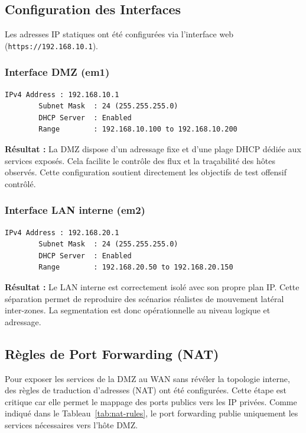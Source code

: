 \documentclass[12pt,a4paper,openany]{report}
\begin{document}
	\subsection{Configuration des Interfaces}
	Les adresses IP statiques ont été configurées via l'interface web (\texttt{https://192.168.10.1}).
	
	\subsubsection{Interface DMZ (em1)}
	\begin{lstlisting}[caption=Configuration IP DMZ]
		IPv4 Address : 192.168.10.1
		Subnet Mask  : 24 (255.255.255.0)
		DHCP Server  : Enabled
		Range        : 192.168.10.100 to 192.168.10.200
	\end{lstlisting}
	\textbf{Résultat :} La DMZ dispose d’un adressage fixe et d’une plage DHCP dédiée aux services exposés. Cela facilite le contrôle des flux et la traçabilité des hôtes observés. Cette configuration soutient directement les objectifs de test offensif contrôlé.
	
	\subsubsection{Interface LAN interne (em2)}
	\begin{lstlisting}[caption=Configuration IP LAN]
		IPv4 Address : 192.168.20.1
		Subnet Mask  : 24 (255.255.255.0)
		DHCP Server  : Enabled
		Range        : 192.168.20.50 to 192.168.20.150
	\end{lstlisting}
	\textbf{Résultat :} Le LAN interne est correctement isolé avec son propre plan IP. Cette séparation permet de reproduire des scénarios réalistes de mouvement latéral inter-zones. La segmentation est donc opérationnelle au niveau logique et adressage.
	
	\subsection{Règles de Port Forwarding (NAT)}
	Pour exposer les services de la DMZ au WAN sans révéler la topologie interne, des règles de traduction d'adresses (NAT) ont été configurées. Cette étape est critique car elle permet le mappage des ports publics vers les IP privées.
	Comme indiqué dans le Tableau~\ref{tab:nat-rules}, le port forwarding publie uniquement les services nécessaires vers l'hôte DMZ.
	
\end{document}

